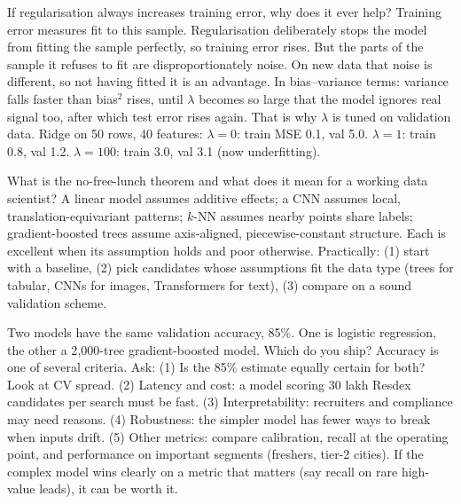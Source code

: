 \begin{qa}{\deep If regularisation always increases training error, why does it ever help?}
\why Training error measures fit to this sample. Regularisation deliberately stops the model from fitting the
sample perfectly, so training error rises. But the parts of the sample it refuses to fit are disproportionately
noise. On new data that noise is different, so not having fitted it is an advantage. In bias--variance terms:
variance falls faster than bias$^2$ rises, until $\lambda$ becomes so large that the model ignores real signal
too, after which test error rises again. That is why $\lambda$ is tuned on validation data.
\worked Ridge on 50 rows, 40 features: $\lambda = 0$: train MSE 0.1, val 5.0. $\lambda = 1$: train 0.8, val 1.2.
$\lambda = 100$: train 3.0, val 3.1 (now underfitting).
\end{qa}

\begin{qa}{What is the no-free-lunch theorem and what does it mean for a working data scientist?}
\why A linear model assumes additive effects; a CNN assumes local, translation-equivariant patterns; $k$-NN
assumes nearby points share labels; gradient-boosted trees assume axis-aligned, piecewise-constant structure.
Each is excellent when its assumption holds and poor otherwise. Practically: (1) start with a baseline,
(2) pick candidates whose assumptions fit the data type (trees for tabular, CNNs for images, Transformers for
text), (3) compare on a sound validation scheme.
\end{qa}

\begin{qa}{\deep Two models have the same validation accuracy, 85\%. One is logistic regression, the other a
2{,}000-tree gradient-boosted model. Which do you ship?}
\why Accuracy is one of several criteria. Ask: (1) Is the 85\% estimate equally certain for both? Look at CV
spread. (2) Latency and cost: a model scoring 30 lakh Resdex candidates per search must be fast. (3)
Interpretability: recruiters and compliance may need reasons. (4) Robustness: the simpler model has fewer
ways to break when inputs drift. (5) Other metrics: compare calibration, recall at the operating point, and
performance on important segments (freshers, tier-2 cities). If the complex model wins clearly on a metric
that matters (say recall on rare high-value leads), it can be worth it.
\end{qa}

